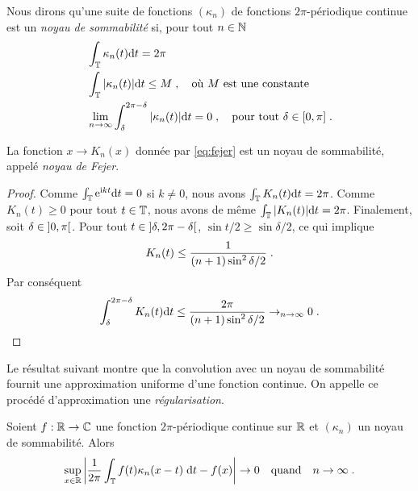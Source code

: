 \begin{definition}
  Nous dirons qu'une suite de fonctions $(\kappa_n)$ de fonctions
  $2\pi$-p\'{e}riodique continue est un \emph{noyau de sommabilit\'{e}} si, pour tout
  $n \in \mathbb{N}$
\begin{align}
\label{eq:kernel:normalisation}
& \int_{\mathbb{T}} \kappa_n(t) \mathrm{d} t = 2 \pi \\
\label{eq:kernel:norme-L1}
& \int_{\mathbb{T}} | \kappa_n(t) | \mathrm{d} t \leq M \;, \quad \text{o\`{u} $M$ est une constante} \\
\label{eq:kernel:negligeable}
& \lim_{n \to \infty} \int_{\delta}^{2 \pi - \delta} |\kappa_n(t)| \mathrm{d} t = 0 \;, \quad \text{pour tout $\delta \in \left[0,\pi\right]$} \;.
\end{align}
\end{definition}
\begin{lemma}
\label{lem:fejer}
La fonction $x \to K_n(x)$ donn\'{e}e par \eqref{eq:fejer} est un noyau de sommabilit\'{e}, appel\'{e} \emph{noyau de Fejer}.
\end{lemma}
\begin{proof}\smartqed
Comme $\int_{\mathbb{T}} \mathrm{e}^{\mathrm{i} k t} \mathrm{d} t= 0$ si $k \ne 0$, nous avons $\int_{\mathbb{T}} K_n(t) \mathrm{d} t= 2 \pi$.
Comme $K_n(t) \geq 0$ pour tout $t \in \mathbb{T}$, nous avons de m\^{e}me $\int_{\mathbb{T}} |K_n(t)| \mathrm{d} t = 2 \pi$.
Finalement, soit $\delta \in \left]0,\pi\right[ $. Pour tout $t \in \left]\delta,2\pi - \delta\right[$, $\sin t/2 \geq \sin \delta/2$,
ce qui implique
\[
K_n(t) \leq \frac{1}{(n+1) \sin^2 \delta/2} \;.
\]
Par cons\'{e}quent
\[
\int_{\delta}^{2 \pi - \delta} K_n(t) \mathrm{d} t \leq \frac{2 \pi}{(n+1) \sin^2 \delta/2} \to_{n \to \infty} 0 \;.
\]

\end{proof}
Le r\'{e}sultat suivant montre que la convolution avec un noyau de sommabilit\'{e}
fournit une approximation uniforme d'une fonction continue. On appelle ce
proc\'{e}d\'{e} d'approximation une \emph{r\'{e}gularisation}.
\begin{lemma}
\label{lem:approxLinfini-convol-noyau}
Soient $f: \mathbb{R} \to \mathbb{C}$ une fonction $2\pi$-p\'{e}riodique continue sur $\mathbb{R}$
et  $(\kappa_n)$ un noyau de sommabilit\'{e}. Alors
$$
\sup_{x\in\mathbb{R}}
\left|\frac{1}{2 \pi} \int_{\mathbb{T}} f(t) \kappa_n(x-t)\;  \mathrm{d} t - f(x)\right| \to 0
\quad\text{quand}\quad n\to\infty\;.
$$
\end{lemma}
